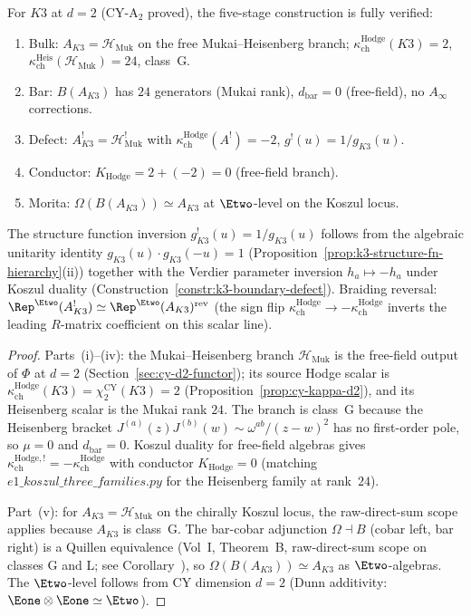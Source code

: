 \begin{proposition}[K3 defect algebra: the \texorpdfstring{$d = 2$}{d = 2} verified case]
\label{prop:defect-koszul-k3}
For $K3$ at $d = 2$ (CY-A$_2$ proved), the five-stage construction is fully verified:
\begin{enumerate}[label=\textup{(\roman*)}]
 \item Bulk: $A_{K3} = \mathcal H_{\mathrm{Muk}}$ on the free Mukai--Heisenberg branch; $\kappa_{\mathrm{ch}}^{\mathrm{Hodge}}(K3)=2$, $\kappa_{\mathrm{ch}}^{\mathrm{Heis}}(\mathcal H_{\mathrm{Muk}})=24$, class~G.
 \item Bar: $B(A_{K3})$ has $24$ generators (Mukai rank), $d_{\mathrm{bar}} = 0$ (free-field), no $A_\infty$ corrections.
 \item Defect: $A_{K3}^! = \mathcal H_{\mathrm{Muk}}^!$ with $\kappa_{\mathrm{ch}}^{\mathrm{Hodge}}(A^!) = -2$, $g^!(u) = 1/g_{K3}(u)$.
 \item Conductor: $K_{\mathrm{Hodge}} = 2 + (-2) = 0$ (free-field branch).
 \item Morita: $\Omega(B(A_{K3})) \simeq A_{K3}$ at $\Etwo$-level on the Koszul locus.
\end{enumerate}
The structure function inversion $g_{K3}^!(u) = 1/g_{K3}(u)$ follows from the algebraic unitarity identity $g_{K3}(u) \cdot g_{K3}(-u) = 1$ (Proposition~\ref{prop:k3-structure-fn-hierarchy}(ii)) together with the Verdier parameter inversion $h_a \mapsto -h_a$ under Koszul duality (Construction~\ref{constr:k3-boundary-defect}). Braiding reversal: $\Rep^{\Etwo}(A_{K3}^!) \simeq \Rep^{\Etwo}(A_{K3})^{\mathrm{rev}}$ (the sign flip $\kappa_{\mathrm{ch}}^{\mathrm{Hodge}} \to -\kappa_{\mathrm{ch}}^{\mathrm{Hodge}}$ inverts the leading $R$-matrix coefficient on this scalar line).
\end{proposition}

\begin{proof}
Parts~(i)--(iv): the Mukai--Heisenberg branch $\mathcal H_{\mathrm{Muk}}$ is the free-field output of $\Phi$ at $d = 2$ (Section~\ref{sec:cy-d2-functor}); its source Hodge scalar is $\kappa_{\mathrm{ch}}^{\mathrm{Hodge}}(K3) = \chi^{\mathrm{CY}}_2(K3) = 2$ (Proposition~\ref{prop:cy-kappa-d2}), and its Heisenberg scalar is the Mukai rank $24$. The branch is class~G because the Heisenberg bracket $J^{(a)}(z) J^{(b)}(w) \sim \omega^{ab}/(z-w)^2$ has no first-order pole, so $\mu = 0$ and $d_{\mathrm{bar}} = 0$. Koszul duality for free-field algebras gives $\kappa_{\mathrm{ch}}^{\mathrm{Hodge},!} = -\kappa_{\mathrm{ch}}^{\mathrm{Hodge}}$ with conductor $K_{\mathrm{Hodge}} = 0$ (matching $e1\_koszul\_three\_families.py$ for the Heisenberg family at rank~$24$).

Part~(v): for $A_{K3} = \mathcal H_{\mathrm{Muk}}$ on the chirally Koszul locus, the raw-direct-sum scope applies because $A_{K3}$ is class~G. The bar-cobar adjunction $\Omega \dashv B$ (cobar left, bar right) is a Quillen equivalence (Vol~I, Theorem~B, raw-direct-sum scope on classes G and L; see Corollary~\cite{VolI}), so $\Omega(B(A_{K3})) \simeq A_{K3}$ as $\Etwo$-algebras. The $\Etwo$-level follows from CY dimension $d = 2$ (Dunn additivity: $\Eone \otimes \Eone \simeq \Etwo$).

\end{proof}

